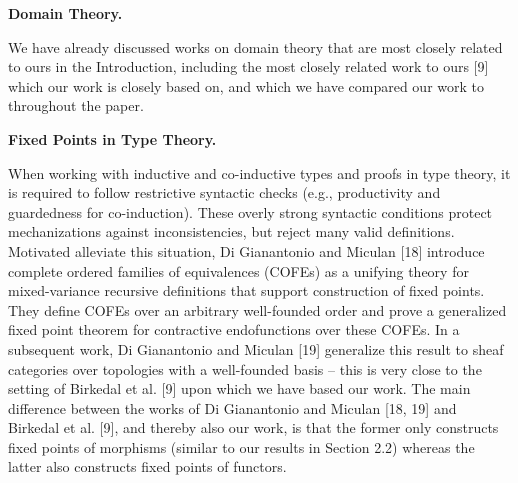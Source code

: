 \documentclass[10pt,a4paper]{article}
\begin{document}
 
\par\medskip\noindent\textbf{Domain Theory.}\par
 
 
We have already discussed works on domain theory that are most closely related to ours in the Introduction, including the most closely related work to ours [9] which our work is closely based on, and which we have compared our work to throughout the paper.\par
 
 
 
 
\par\medskip\noindent\textbf{Fixed Points in Type Theory.}\par
 
 
When working with inductive and co-inductive types and proofs in type theory, it is required to follow restrictive syntactic checks (e.g., productivity and guardedness for co-induction). These overly strong syntactic conditions protect mechanizations against inconsistencies, but reject many valid definitions. Motivated alleviate this situation, Di Gianantonio and Miculan [18] introduce complete ordered families of equivalences (COFEs) as a unifying theory for mixed-variance recursive definitions that support construction of fixed points. They define COFEs over an arbitrary well-founded order and prove a generalized fixed point theorem for contractive endofunctions over these COFEs. In a subsequent work, Di Gianantonio and Miculan [19] generalize this result to sheaf categories over topologies with a well-founded basis – this is very close to the setting of Birkedal et al. [9] upon which we have based our work. The main difference between the works of Di Gianantonio and Miculan [18, 19] and Birkedal et al. [9], and thereby also our work, is that the former only constructs fixed points of morphisms (similar to our results in Section 2.2) whereas the latter also constructs fixed points of functors.\par
 
 
 
 
\end{document}
